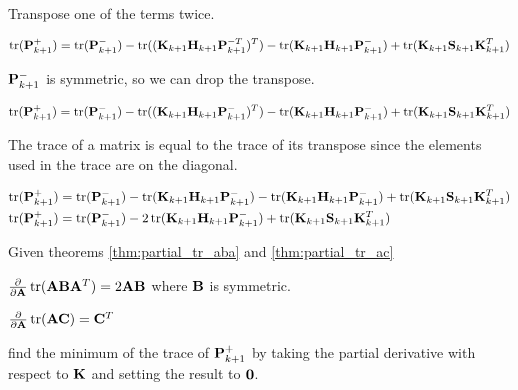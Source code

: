Transpose one of the terms twice.

\begin{equation*}
  \operatorname{tr}(\mathbf{P}_{k+1}^+) = \operatorname{tr}(\mathbf{P}_{k+1}^-) -
    \operatorname{tr}((\mathbf{K}_{k+1}\mathbf{H}_{k+1}\mathbf{P}_{k+1}^{-T})^T) -
    \operatorname{tr}(\mathbf{K}_{k+1}\mathbf{H}_{k+1}\mathbf{P}_{k+1}^-) +
    \operatorname{tr}(\mathbf{K}_{k+1}\mathbf{S}_{k+1}\mathbf{K}_{k+1}^T)
\end{equation*}

$\mathbf{P}_{k+1}^-$ is symmetric, so we can drop the transpose.

\begin{equation*}
  \operatorname{tr}(\mathbf{P}_{k+1}^+) = \operatorname{tr}(\mathbf{P}_{k+1}^-) -
    \operatorname{tr}((\mathbf{K}_{k+1}\mathbf{H}_{k+1}\mathbf{P}_{k+1}^-)^T) -
    \operatorname{tr}(\mathbf{K}_{k+1}\mathbf{H}_{k+1}\mathbf{P}_{k+1}^-) +
    \operatorname{tr}(\mathbf{K}_{k+1}\mathbf{S}_{k+1}\mathbf{K}_{k+1}^T)
\end{equation*}

The trace of a matrix is equal to the trace of its transpose since the elements
used in the trace are on the diagonal.

\begin{align*}
  \operatorname{tr}(\mathbf{P}_{k+1}^+) &= \operatorname{tr}(\mathbf{P}_{k+1}^-) -
    \operatorname{tr}(\mathbf{K}_{k+1}\mathbf{H}_{k+1}\mathbf{P}_{k+1}^-) -
    \operatorname{tr}(\mathbf{K}_{k+1}\mathbf{H}_{k+1}\mathbf{P}_{k+1}^-) +
    \operatorname{tr}(\mathbf{K}_{k+1}\mathbf{S}_{k+1}\mathbf{K}_{k+1}^T) \\
  \operatorname{tr}(\mathbf{P}_{k+1}^+) &= \operatorname{tr}(\mathbf{P}_{k+1}^-) -
    2\operatorname{tr}(\mathbf{K}_{k+1}\mathbf{H}_{k+1}\mathbf{P}_{k+1}^-) +
    \operatorname{tr}(\mathbf{K}_{k+1}\mathbf{S}_{k+1}\mathbf{K}_{k+1}^T)
\end{align*}

Given theorems \ref{thm:partial_tr_aba} and \ref{thm:partial_tr_ac}

\begin{theorem}
  \label{thm:partial_tr_aba}

  $\frac{\partial}{\partial\mathbf{A}}\operatorname{tr}(\mathbf{A}\mathbf{B}\mathbf{A}^T) =
    2\mathbf{A}\mathbf{B}$ where $\mathbf{B}$ is symmetric.
\end{theorem}

\begin{theorem}
  \label{thm:partial_tr_ac}

  $\frac{\partial}{\partial\mathbf{A}}\operatorname{tr}(\mathbf{A}\mathbf{C}) = \mathbf{C}^T$
\end{theorem}

find the minimum of the trace of $\mathbf{P}_{k+1}^+$ by taking the partial
derivative with respect to $\mathbf{K}$ and setting the result to $\mathbf{0}$.

